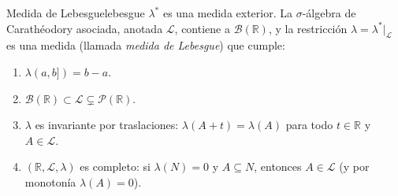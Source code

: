 \documentclass[11pt, a4paper]{article}
\begin{document}
\begin{teorema}{Medida de Lebesgue}{lebesgue}
$\lambda^*$ es una medida exterior. La $\sigma$-álgebra de Carathéodory asociada, anotada
$\mathcal{L}$, contiene a $\mathcal{B}(\mathbb{R})$, y la restricción $\lambda =
\lambda^*|_{\mathcal{L}}$ es una medida (llamada \emph{medida de Lebesgue}) que cumple:
\begin{enumerate}
    \item $\lambda(a, b]) = b - a$.
    \item $\mathcal{B}(\mathbb{R}) \subset \mathcal{L} \subsetneq \mathcal{P}(\mathbb{R})$.
    \item $\lambda$ es invariante por traslaciones: $\lambda(A + t) = \lambda(A)$ para todo $t \in
    \mathbb{R}$ y $A \in \mathcal{L}$.
    \item $(\mathbb{R}, \mathcal{L}, \lambda)$ es completo: si $\lambda(N) = 0$ y $A \subseteq N$,
    entonces $A \in \mathcal{L}$ (y por monotonía $\lambda(A) = 0$).
\end{enumerate}
\end{teorema}
\end{document}
